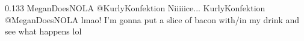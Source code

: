 {0.133}
{\joinNameTweet
{MeganDoesNOLA}
{@KurlyKonfektion Niiiiice...}}
{\joinNameTweet
{KurlyKonfektion}
{@MeganDoesNOLA lmao! I'm gonna put a slice of bacon with/in my drink and see what happens lol}}
%
%
%
%
%
%
%
%
%
%
%
